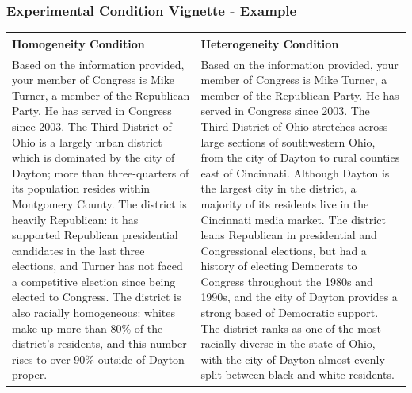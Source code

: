 \documentclass[14pt]{beamer}
\newcommand\tb{\textbf}
\begin{document}
\begin{frame}
\frametitle{Experimental Condition Vignette - Example}
\scriptsize
\begin{table}
	\centering
	\begin{tabulary}{\linewidth}{p{5.5cm}p{5.5cm}}
	\\
	\hline
	\tb{Homogeneity Condition}&\tb{Heterogeneity Condition} \\
	\hline
	Based on the information provided, your member of Congress is Mike Turner, a member of the Republican Party. He has served in Congress since 2003. The Third District of Ohio is a largely urban district which is dominated by the city of Dayton; more than three-quarters of its population resides within Montgomery County. The district is heavily Republican: it has supported Republican presidential candidates in the last three elections, and Turner has not faced a competitive election since being elected to Congress. The district is also racially homogeneous: whites make up more than 80\% of the district’s residents, and this number rises to over 90\% outside of Dayton proper.&Based on the information provided, your member of Congress is Mike Turner, a member of the Republican Party. He has served in Congress since 2003. The Third District of Ohio stretches across large sections of southwestern Ohio, from the city of Dayton to rural counties east of Cincinnati. Although Dayton is the largest city in the district, a majority of its residents live in the Cincinnati media market. The district leans Republican in presidential and Congressional elections, but had a history of electing Democrats to Congress throughout the 1980s and 1990s, and the city of Dayton provides a strong based of Democratic support. The district ranks as one of the most racially diverse in the state of Ohio, with the city of Dayton almost evenly split between black and white residents.\\
	\hline
	\end{tabulary}
\end{table}
\end{frame}
\end{document}
